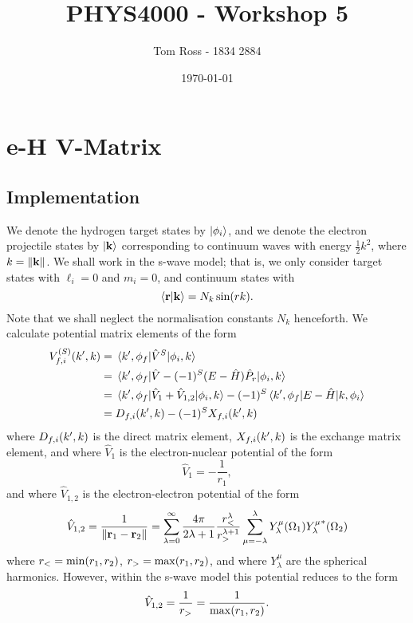 \documentclass{article}
\title{PHYS4000 - Workshop 5}
\author{Tom Ross - 1834 2884}
\date{\today}
\begin{document}
\tableofcontents

\listoffigures

\listoftables

\clearpage

\section{e-H V-Matrix}
\label{sec:e-h-v-matrix}

\subsection{Implementation}
\label{sec:implementation}

We denote the hydrogen target states by $\ket{\phi_{i}}$, and we denote the
electron projectile states by $\ket{\vb{k}}$ corresponding to continuum waves
with energy $\tfrac{1}{2} k^{2}$, where $k = \lVert\vb{k}\rVert$.
We shall work in the s-wave model; that is, we only consider target states
with $\ell_{i} = 0$ and $m_{i} = 0$, and continuum states with
\begin{equation*}
  \braket{\vb{r}}{\vb{k}}
  =
  N_{k}
  \sin(r k)
  .
\end{equation*}
Note that we shall neglect the normalisation constants $N_{k}$ henceforth.
We calculate potential matrix elements of the form
\begin{alignat*}{2}
  V_{f, i}^{(S)}(k', k)
  {}={}
  &
  \mel{k', \phi_{f}}{\hat{V}^{S}}{\phi_{i}, k}
  \\
  {}={}
  &
  \mel
  {k', \phi_{f}}
  {\hat{V} - (-1)^{S}(E- \hat{H})\hat{P}_{r}}
  {\phi_{i}, k}
  \\
  {}={}
  &
  \mel{k', \phi_{f}}{\hat{V}_{1} + \hat{V}_{1, 2}}{\phi_{i}, k}
  -
  (-1)^{S}
  \mel{k', \phi_{f}}{E - \hat{H}}{k, \phi_{i}}
  \\
  {}={}
  &
  D_{f, i}(k', k)
  -
  (-1)^{S}
  X_{f, i}(k', k)
\end{alignat*}
where $D_{f, i}(k', k)$ is the direct matrix element, $X_{f, i}(k', k)$ is
the exchange matrix element, and where $\hat{V}_{1}$ is the electron-nuclear
potential of the form
\begin{equation*}
  \hat{V}_{1}
  =
  -
  \dfrac{1}{r_{1}}
  ,
\end{equation*}
and where $\hat{V}_{1, 2}$ is the electron-electron potential of the form
\begin{equation*}
  \hat{V}_{1, 2}
  =
  \dfrac{1}{\lVert\vb{r}_{1} - \vb{r}_{2}\rVert}
  =
  \sum_{\lambda = 0}^{\infty}
  \dfrac{4\pi}{2\lambda + 1}
  \dfrac{r_{<}^{\lambda}}{r_{>}^{\lambda + 1}}
  \sum_{\mu = -\lambda}^{\lambda}
  Y_{\lambda}^{\mu}(\Omega_{1})
  {Y_{\lambda}^{\mu}}^{*}(\Omega_{2})
\end{equation*}
where $r_{<} = \min(r_{1}, r_{2})$, $r_{>} = \max(r_{1}, r_{2})$,
and where $Y_{\lambda}^{\mu}$ are the spherical harmonics.
However, within the s-wave model this potential reduces to the form
\begin{equation*}
  \hat{V}_{1, 2}
  =
  \dfrac{1}{r_{>}}
  =
  \dfrac{1}{\max(r_{1}, r_{2})}
  .
\end{equation*}
\end{document}
